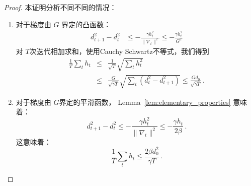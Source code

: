 \begin{proof}
本证明分析不同不同的情况：
\begin{enumerate}
\item
对于梯度由  $G$ 界定的凸函数：
\begin{eqnarray*}
d_{t+1}^2 -  d_t^2 & \leq - \frac{\gamma h_t^2}{\|\nabla_t\|^2} \leq -
                     \frac{\gamma h_t^2}{G^2}  
\end{eqnarray*}
对 $T$次迭代相加求和，使用Cauchy Schwartz不等式，我们得到
\begin{eqnarray*}
\frac{1}{T} \sum_t h_t 
& \leq&  \frac{1}{\sqrt{T}} \sqrt{\sum_t h_t^2} \\
& \leq& \frac{ G}{\sqrt{\gamma T}} \sqrt{\sum_t (d_{t}^2 - d_{t+1}^2)} \leq
\frac{ G d_0 }{\sqrt{\gamma T}} \, .
\end{eqnarray*}

\item
对于梯度由  $G$界定的平滑函数， Lemma~\ref{lem:elementary_properties} 意味着：
\[
d_{t+1}^2 - d_t^2 \leq - \frac{\gamma h_t^2}{\|\nabla_t\|^2} \leq -
\frac{\gamma h_t}{2 \beta} \, .
\]
这意味着：
\[
\frac{1}{T} \sum_t h_t  \leq \frac{2 \beta d_0^2}{\gamma T}\, .
\]


\end{enumerate}
\end{proof}
